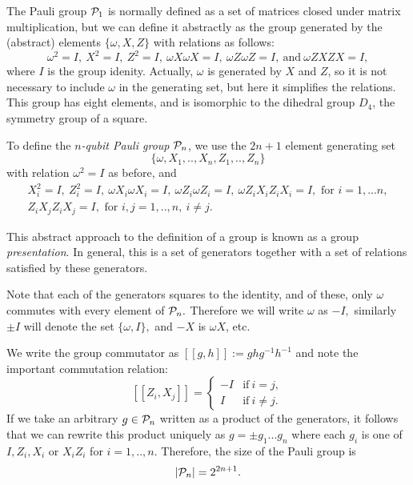 The Pauli group $\mathcal{P}_1$ is normally 
defined as a set of matrices closed under
matrix multiplication, but we can define
it abstractly
as the group generated
by the (abstract) elements $\{\omega, X, Z\}$ with
relations as follows:
$$
\omega^2=I,\ X^2=I,\ Z^2=I,\ \omega X\omega X=I,\ \omega Z\omega Z=I,\ \mbox{and}\  \omega ZXZX=I,
$$
where $I$ is the group idenity.
Actually, $\omega $ is generated by $X$ and $Z$, so
it is not necessary to include $\omega $ in the generating set,
but here it simplifies the relations.
This group has eight elements, and is isomorphic to the dihedral group $D_4$,
the symmetry group of a square.

To define
the {\it $n$-qubit Pauli group} $\mathcal{P}_n$, 
we use the $2n+1$ element 
generating set 
$$\{\omega , X_1, .., X_n, Z_1, .., Z_n\}$$
with relation $\omega^2=I$ as before, and
\begin{equation}\label{presentation}
\begin{array}{c}
X_i^2=I,\ Z_i^2=I,\ \omega X_i\omega X_i=I,\ \omega Z_i\omega Z_i=I,\ \omega Z_iX_iZ_iX_i=I, 
\mbox{\ for\ } i=1,...n,\\
Z_iX_jZ_iX_j=I, \mbox{\ for\ } i, j = 1,..,n,\ i\ne j.
\end{array}
\end{equation}

This abstract approach to the definition of a group is known as
a group \emph{presentation}. In general, this is a set of
generators together with a set of relations satisfied
by these generators.

Note that each of the generators squares to the identity,
and of these, only $\omega$ commutes with every element of $\mathcal{P}_n.$
Therefore we will write $\omega$ as $-I,$
similarly $\pm I$ will denote the
set $\{\omega, I\},$ and $-X$ is $\omega X$, etc.

We write the group commutator as
$[[g, h]]:=ghg^{-1}h^{-1}$
and note the important commutation relation:
$$
    [[Z_i, X_j]] = 
    \left\{ \begin{array}{ll}
 -I &\mbox{if}\ i=j,\\
 I &\mbox{if}\ i\ne j.\end{array}\right.
$$
If we take an arbitrary $g\in \mathcal{P}_n$
written as a product of the generators,
it follows that we can rewrite this
product uniquely as %
$ g = \pm g_1 ... g_n $
where each $g_i$ is one of $I, Z_i, X_i$ or $X_i Z_i$
for $i=1,..,n.$
Therefore, the size of the
Pauli group is 
$$
    |\mathcal{P}_n| = 2^{2n+1}.
$$

